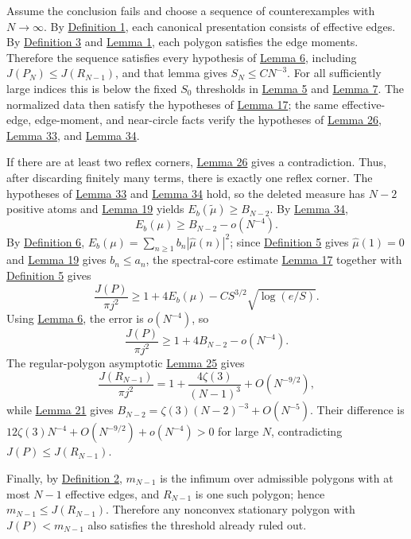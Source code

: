 \documentclass[11pt]{article}
\begin{document}
Assume the conclusion fails and choose a sequence of counterexamples
with \(N\to\infty\). By \hyperref[def-admissible-polygon]{Definition 1},
each canonical presentation consists of effective edges. By
\hyperref[def-stationary-polygon]{Definition 3} and
\hyperref[lem-edge-moments]{Lemma 1}, each polygon satisfies the edge
moments. Therefore the sequence satisfies every hypothesis of
\hyperref[lem-near-circle-conformal]{Lemma 6}, including
\(J(P_N)\le J(R_{N-1})\), and that lemma gives \(S_N\le CN^{-3}\). For
all sufficiently large indices this is below the fixed \(S_0\)
thresholds in \hyperref[lem-disk-perturbation]{Lemma 5} and
\hyperref[lem-gradient-perturbation]{Lemma 7}. The normalized data then
satisfy the hypotheses of \hyperref[lem-spectral-core]{Lemma 17}; the
same effective-edge, edge-moment, and near-circle facts verify the
hypotheses of \hyperref[lem-two-reflex-exclusion]{Lemma 26},
\hyperref[lem-single-reflex-small-atom]{Lemma 33}, and
\hyperref[lem-atom-deletion]{Lemma 34}.

If there are at least two reflex corners,
\hyperref[lem-two-reflex-exclusion]{Lemma 26} gives a contradiction.
Thus, after discarding finitely many terms, there is exactly one reflex
corner. The hypotheses of \hyperref[lem-single-reflex-small-atom]{Lemma
33} and \hyperref[lem-atom-deletion]{Lemma 34} hold, so the deleted
measure has \(N-2\) positive atoms and
\hyperref[lem-kernel-comparison]{Lemma 19} yields
\(E_b(\widetilde\mu)\ge B_{N-2}\). By \hyperref[lem-atom-deletion]{Lemma
34}, \[
E_b(\mu)\ge B_{N-2}-o(N^{-4}).
\] By \hyperref[def-positive-kernel]{Definition 6},
\(E_b(\mu)=\sum_{n\ge1}b_n|\widehat\mu(n)|^2\); since
\hyperref[def-turn-measure]{Definition 5} gives \(\widehat\mu(1)=0\) and
\hyperref[lem-kernel-comparison]{Lemma 19} gives \(b_n\le a_n\), the
spectral-core estimate \hyperref[lem-spectral-core]{Lemma 17} together
with \hyperref[def-turn-measure]{Definition 5} gives \[
\frac{J(P)}{\pi j^2}\ge1+4E_b(\mu)-C S^{3/2}\sqrt{\log(e/S)}.
\] Using \hyperref[lem-near-circle-conformal]{Lemma 6}, the error is
\(o(N^{-4})\), so \[
\frac{J(P)}{\pi j^2}\ge1+4B_{N-2}-o(N^{-4}).
\] The regular-polygon asymptotic
\hyperref[lem-regular-polygon-asymptotic]{Lemma 25} gives \[
\frac{J(R_{N-1})}{\pi j^2}=1+\frac{4\zeta(3)}{(N-1)^3}+O(N^{-9/2}),
\] while \hyperref[lem-bp-asymptotic]{Lemma 21} gives
\(B_{N-2}=\zeta(3)(N-2)^{-3}+O(N^{-5})\). Their difference is
\(12\zeta(3)N^{-4}+O(N^{-9/2})+o(N^{-4})>0\) for large \(N\),
contradicting \(J(P)\le J(R_{N-1})\).

Finally, by \hyperref[def-j-functional]{Definition 2}, \(m_{N-1}\) is
the infimum over admissible polygons with at most \(N-1\) effective
edges, and \(R_{N-1}\) is one such polygon; hence
\(m_{N-1}\le J(R_{N-1})\). Therefore any nonconvex stationary polygon
with \(J(P)<m_{N-1}\) also satisfies the threshold already ruled out.
\end{document}
